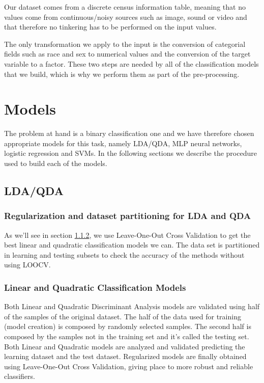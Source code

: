 \documentclass[english]{scrartcl}
\begin{document}
Our dataset comes from a discrete census information table, meaning that no values come from continuous/noisy sources such as image, sound or video and that therefore no tinkering has to be performed on the input values.

The only transformation we apply to the input is the conversion of categorial fields such as race and sex to numerical values and the conversion of the target variable to a factor. These two steps are needed by all of the classification models that we build, which is why we perform them as part of the pre-processing.

\section{Models}

The problem at hand is a binary classification one and we have therefore chosen appropriate models for this task, namely LDA/QDA, MLP neural networks, logistic regression and SVMs. In the following sections we describe the procedure used to build each of the models.

    \subsection{LDA/QDA}
    
    \subsubsection{Regularization and dataset partitioning for LDA and QDA}
    As we'll see in section \ref{sec:methods:ldaqda}, we use Leave-One-Out Cross Validation to get the best linear and quadratic classification models we 
    can. The data set is partitioned in learning and testing subsets to check the accuracy of the methods without using LOOCV.
    
    \subsubsection{Linear and Quadratic Classification Models}
    \label{sec:methods:ldaqda}
    Both Linear and Quadratic Discriminant Analysis models are validated using
    half of the samples of the original dataset. The half of the data used for training (model creation) is composed by
    randomly selected samples. The second half is composed by the samples not in the training set and it's called the 
    testing set. Both Linear and Quadratic models are analyzed and validated predicting the learning dataset and the test
    dataset. Regularized models are finally obtained using Leave-One-Out Cross Validation, giving place to more robust
    and reliable classifiers.
    
\end{document}

